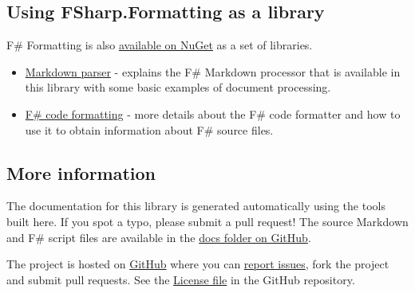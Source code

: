 \documentclass{article}
\begin{document}
\subsection*{Using FSharp.Formatting as a library}



F\# Formatting is also \href{https://nuget.org/packages/FSharp.Formatting}{available on NuGet} as a set of libraries.
\begin{itemize}
\item 

\href{markdown.html}{Markdown parser} - explains the F\# Markdown
processor that is available in this library with some basic examples of
document processing.

\item 

\href{codeformat.html}{F\# code formatting} - more details about the F\# code
formatter and how to use it to obtain information about F\# source files.

\end{itemize}

\subsection*{More information}



The documentation for this library is generated automatically using the tools
built here. If you spot a typo, please submit a pull request! The source Markdown and F\# script files are
available in the \href{https://github.com/fsprojects/FSharp.Formatting/tree/master/docs}{docs folder on GitHub}.


The project is hosted on \href{https://github.com/fsprojects/FSharp.Formatting}{GitHub} where you can
\href{https://github.com/fsprojects/FSharp.Formatting/issues}{report issues}, fork the project and submit pull requests.
See the  \href{https://github.com/fsprojects/FSharp.Formatting/blob/master/LICENSE.md}{License file} in the GitHub repository.
\end{document}
